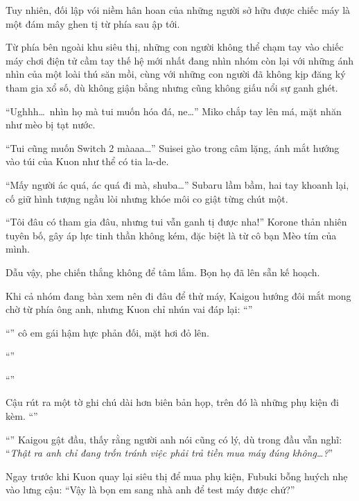 \documentclass[../main.tex]{subfiles}
\begin{document}
Tuy nhiên, đối lập vói niềm hân hoan của những người sở hữu được chiếc máy là một đám mây ghen tị từ phía sau ập tới.

Từ phía bên ngoài khu siêu thị, những con người không thể chạm tay vào chiếc máy chơi điện tử cầm tay thế hệ mới nhất đang nhìn nhóm còn lại với những ánh nhìn của một loài thú săn mồi, cùng với những con người đã không kịp đăng ký tham gia xổ số, dù không giận bẳng nhưng cũng không giấu nổi sự ganh ghét.

``Ughhh\dots\ nhìn họ mà tui muốn hóa đá, ne\dots'' Miko chắp tay lên má, mặt nhăn như mèo bị tạt nước.

``Tui cũng muốn Switch 2 màaaa\dots'' Suisei gào trong câm lặng, ánh mắt hướng vào túi của Kuon như thể có tia la-de.

``Mấy người ác quá, ác quá đi mà, shuba\dots'' Subaru lầm bầm, hai tay khoanh lại, cố giữ hình tượng ngầu lòi nhưng khóe môi co giật từng chút một.

``Tôi đâu có tham gia đâu, nhưng tui vẫn ganh tị được nha!'' Korone thản nhiên tuyên bố, gây áp lực tinh thần không kém, đặc biệt là từ cô bạn Mèo tím của mình.

Dẫu vậy, phe chiến thắng không để tâm lắm. Bọn họ đã lên sẵn kế hoạch.

\ct

Khi cả nhóm đang bàn xem nên đi đâu để thử máy, Kaigou hướng đôi mắt mong chờ từ phía ông anh, nhưng Kuon chỉ nhún vai đáp lại: ``''

``'' cô em gái hậm hực phản đối, mặt hơi đỏ lên.

``''

``''

Cậu rút ra một tờ ghi chú dài hơn biên bản họp, trên đó là những phụ kiện đi kèm. ``''

``'' Kaigou gật đầu, thấy rằng người anh nói cũng có lý, dù trong đầu vẫn nghĩ: ``\textit{Thật ra anh chỉ đang trốn tránh việc phải trả tiền mua máy đúng không\dots?}''

Ngay trước khi Kuon quay lại siêu thị để mua phụ kiện, Fubuki bỗng huých nhẹ vào lưng cậu: ``Vậy là bọn em sang nhà anh để test máy được chứ?''
\end{document}
